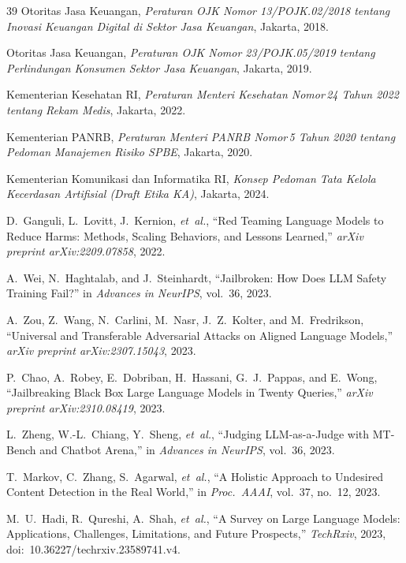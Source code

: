 \documentclass[conference]{IEEEtran}
\begin{document}
\begin{thebibliography}{39}
Otoritas Jasa Keuangan, \textit{Peraturan OJK Nomor 13/POJK.02/2018 tentang
Inovasi Keuangan Digital di Sektor Jasa Keuangan}, Jakarta, 2018.

Otoritas Jasa Keuangan, \textit{Peraturan OJK Nomor 23/POJK.05/2019 tentang
Perlindungan Konsumen Sektor Jasa Keuangan}, Jakarta, 2019.

Kementerian Kesehatan RI, \textit{Peraturan Menteri Kesehatan Nomor\,24 Tahun
2022 tentang Rekam Medis}, Jakarta, 2022.

Kementerian PANRB, \textit{Peraturan Menteri PANRB Nomor\,5 Tahun 2020 tentang
Pedoman Manajemen Risiko SPBE}, Jakarta, 2020.

Kementerian Komunikasi dan Informatika RI, \textit{Konsep Pedoman Tata Kelola
Kecerdasan Artifisial (Draft Etika KA)}, Jakarta, 2024.

D.~Ganguli, L.~Lovitt, J.~Kernion, \textit{et~al.}, ``Red Teaming Language
Models to Reduce Harms: Methods, Scaling Behaviors, and Lessons Learned,''
\textit{arXiv preprint arXiv:2209.07858}, 2022.

A.~Wei, N.~Haghtalab, and J.~Steinhardt, ``Jailbroken: How Does LLM Safety
Training Fail?'' in \textit{Advances in NeurIPS}, vol.~36, 2023.

A.~Zou, Z.~Wang, N.~Carlini, M.~Nasr, J.~Z.~Kolter, and M.~Fredrikson,
``Universal and Transferable Adversarial Attacks on Aligned Language Models,''
\textit{arXiv preprint arXiv:2307.15043}, 2023.

P.~Chao, A.~Robey, E.~Dobriban, H.~Hassani, G.~J.~Pappas, and E.~Wong,
``Jailbreaking Black Box Large Language Models in Twenty Queries,''
\textit{arXiv preprint arXiv:2310.08419}, 2023.

L.~Zheng, W.-L.~Chiang, Y.~Sheng, \textit{et~al.}, ``Judging LLM-as-a-Judge
with MT-Bench and Chatbot Arena,'' in \textit{Advances in NeurIPS}, vol.~36,
2023.

T.~Markov, C.~Zhang, S.~Agarwal, \textit{et~al.}, ``A Holistic Approach to
Undesired Content Detection in the Real World,'' in \textit{Proc.\ AAAI},
vol.~37, no.~12, 2023.

M.~U.~Hadi, R.~Qureshi, A.~Shah, \textit{et~al.}, ``A Survey on Large Language
Models: Applications, Challenges, Limitations, and Future Prospects,''
\textit{TechRxiv}, 2023, doi:~10.36227/techrxiv.23589741.v4.


\end{thebibliography}
\end{document}
